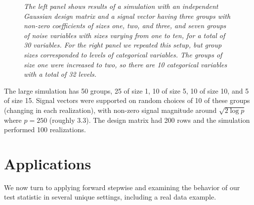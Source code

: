\documentclass{imsart}
\begin{document}
\begin{figure}[h]
\begin{center}
\hspace{-15pt}
\caption{\small \it The left panel shows results of a simulation with
  an independent Gaussian design matrix and a signal vector having
  three groups with non-zero coefficients of sizes one, two, and
  three, and seven groups of noise variables with sizes varying from
  one to ten, for a total of 30 variables. For the right panel we
  repeated this setup, but group sizes corresponded to levels of
  categorical variables. The groups of size one were increased to two,
so there are 10 categorical variables with a total of 32 levels.}
\end{center}
\end{figure}



The large simulation has 50 groups, 25 of size 1, 10 of size 5, 10 of
size 10, and 5 of size 15. Signal vectors were supported on random
choices of 10 of these groups (changing in each realization), with
non-zero signal magnitude around $\sqrt{2\log p}$ where $p = 250$
(roughly 3.3). The design matrix had 200 rows and the simulation
performed 100 realizations.



\section{Applications}
\label{sec:applications}
We now turn to applying forward stepwise and examining the behavior of
our test statistic in several unique settings, including a real data
example.
\end{document}
